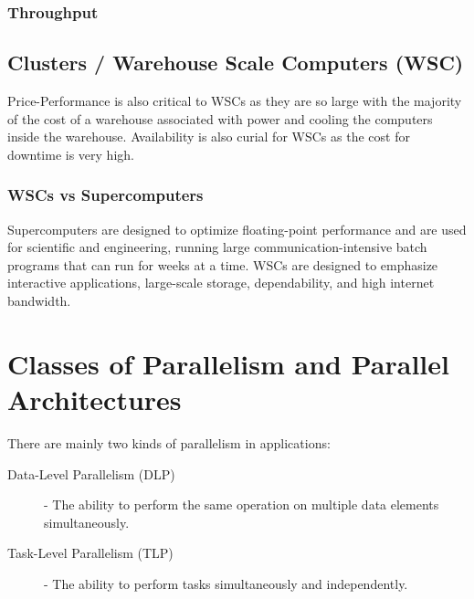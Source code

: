\documentclass[12pt letter]{report}
\begin{document}
\subsection{Throughput}

\section{Clusters / Warehouse Scale Computers (WSC)}


Price-Performance is also critical to WSCs as they are so large with the majority of the cost of a warehouse associated
with power and cooling the computers inside the warehouse. Availability is also curial for WSCs as the cost for downtime
is very high.

\subsection{WSCs vs Supercomputers}

Supercomputers are designed to optimize floating-point performance and are used for scientific and engineering, running
large communication-intensive batch programs that can run for weeks at a time. WSCs are designed to emphasize
interactive applications, large-scale storage, dependability, and high internet bandwidth.

\chapter{Classes of Parallelism and Parallel Architectures}

There are mainly two kinds of parallelism in applications:
\begin{description}
  \item[Data-Level Parallelism (DLP)] - The ability to perform the same operation on multiple data elements simultaneously.
  \item[Task-Level Parallelism (TLP)] - The ability to perform tasks simultaneously and independently.
\end{description}
\end{document}
